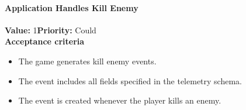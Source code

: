 \paragraph{Application Handles Kill Enemy}
\textbf{Value:} 1\quad \textbf{Priority:} Could\\
\textbf{Acceptance criteria}
\begin{itemize}
  \item The game generates kill enemy events.
  \item The event includes all fields specified in the telemetry schema.
  \item The event is created whenever the player kills an enemy.
\end{itemize}
